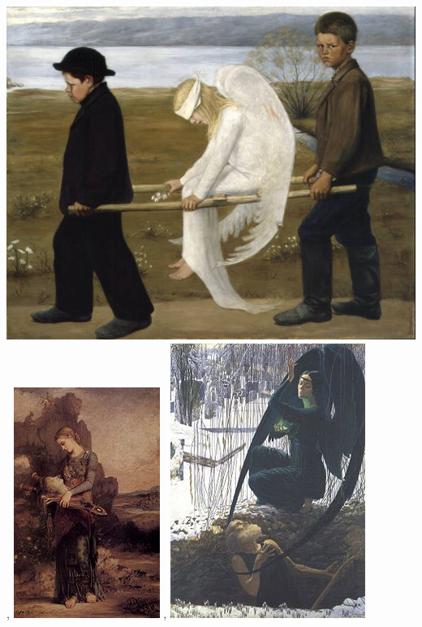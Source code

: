 \begin{tkzltxexample}[small]
 \begin{alterqcm}[lq=8cm,numprop=true,sep]
 {{%
 \hfil\includegraphics[scale=.25]{The_Wounded_Angel_-_Hugo_Simberg.jpg}\hfil
 },{%
 \hfil\includegraphics[scale=.5]{180px-Gustave_Moreau_007.jpg}\hfil
 },{%
 \hfil\includegraphics[scale=.4]{240px-Mort_du_fossoyeur.jpg}\hfil}}

\end{alterqcm}
\end{tkzltxexample}
